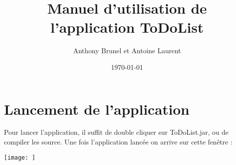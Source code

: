 \documentclass{article}
\title{Manuel d'utilisation de l'application ToDoList}
\author{Anthony Brunel et Antoine Laurent}
\date{\today}
\begin{document}
\maketitle
\newpage

\section{Lancement de l'application}

Pour lancer l'application, il suffit de double cliquer sur ToDoList.jar, ou de compiler les source.
Une fois l'application lancée on arrive sur cette fenêtre : 

\texttt{[image: ]}
\end{document}
